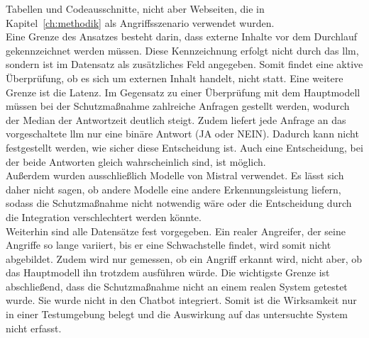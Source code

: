 Tabellen und Codeausschnitte, nicht aber Webseiten, die in Kapitel~\ref{ch:methodik} als Angriffsszenario verwendet wurden. \\
Eine Grenze des Ansatzes besteht darin, dass externe Inhalte vor dem Durchlauf gekennzeichnet werden müssen. Diese Kennzeichnung erfolgt nicht durch das \ac{llm}, sondern
ist im Datensatz als zusätzliches Feld angegeben. Somit findet eine aktive Überprüfung, ob es sich um externen Inhalt handelt, nicht statt. Eine weitere 
Grenze ist die Latenz. Im Gegensatz zu einer Überprüfung mit dem Hauptmodell müssen bei der Schutzmaßnahme zahlreiche Anfragen gestellt werden, wodurch der Median
der Antwortzeit deutlich steigt. Zudem liefert jede Anfrage an das vorgeschaltete \ac{llm} nur eine binäre Antwort (JA oder NEIN). Dadurch kann nicht 
festgestellt werden, wie sicher diese Entscheidung ist. Auch eine Entscheidung, bei der beide Antworten gleich wahrscheinlich sind, ist möglich. \\
Außerdem wurden ausschließlich Modelle von Mistral 
verwendet. Es lässt sich daher nicht sagen, ob andere Modelle eine andere Erkennungsleistung liefern, sodass die Schutzmaßnahme nicht notwendig wäre oder die
Entscheidung durch die Integration verschlechtert werden könnte. \\
Weiterhin sind alle Datensätze fest vorgegeben. Ein realer Angreifer, der seine Angriffe so lange variiert, bis er eine Schwachstelle findet, wird somit nicht 
abgebildet. Zudem wird nur gemessen, ob ein Angriff erkannt wird, nicht aber, ob das Hauptmodell ihn trotzdem ausführen würde. Die wichtigste Grenze ist
abschließend, dass die Schutzmaßnahme nicht an einem realen System getestet wurde. Sie wurde nicht in den Chatbot integriert. 
Somit ist die Wirksamkeit nur in einer Testumgebung belegt und die Auswirkung auf das untersuchte System nicht erfasst.